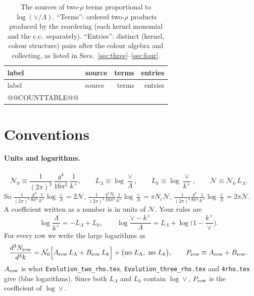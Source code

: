 \documentclass[10pt]{article}
\numberwithin{equation}{section}
\newcommand{\NN}{\mathcal N}
\newcommand{\NO}{\mathcal N_0}
\newcommand{\LL}{L_\Lambda}
\newcommand{\Lk}{L_k}
\begin{document}
\begin{longtable}{@{}l >{\raggedright\arraybackslash}p{} r r@{}}
\caption{The sources of two-$\rho$ terms proportional to $\log(\vee/\Lambda)$. ``Terms'': ordered two-$\rho$ products produced by the reordering (each kernel monomial and the c.c.\ separately). ``Entries'': distinct (kernel, colour structure) pairs after the colour algebra and collecting, as listed in Secs.~\ref{sec:three}--\ref{sec:four}.}\label{tab:count}\\
label & source & terms & entries\\ \hline\endfirsthead
label & source & terms & entries\\ \hline\endhead
@@COUNTTABLE@@
\end{longtable}

\section{Conventions}\label{sec:conv}
\paragraph{Units and logarithms.}
\begin{equation}
\NO\equiv\frac{1}{(2\pi)^3}\,\frac{g^4}{16\pi^5}\,\frac{1}{k^+},\qquad \LL\equiv\log\frac{\vee}{\Lambda},\qquad\Lk\equiv\log\frac{\vee}{k^+},\qquad \NN\equiv\NO\,\LL .
\end{equation}
So $\frac{1}{(2\pi)^3}\frac{g^4}{8\pi^5}\frac1{k^+}\log\frac\vee\Lambda=2\NN$, $\frac{1}{(2\pi)^3}\frac{g^4N_c}{16\pi^4}\frac1{k^+}\log\frac\vee\Lambda=\pi N_c\NN$, $\frac{1}{(2\pi)^3}\frac{g^4}{8\pi^4}\frac1{k^+}\log\frac\vee\Lambda=2\pi\NN$. A coefficient written as a number is in units of $\NN$. Your rules are
\begin{equation}
\log\frac{\Lambda}{k^+}=-\LL+\Lk,\qquad \log\frac{\vee-k^+}{\Lambda}=\LL+\log\Big(1-\frac{k^+}{\vee}\Big).
\end{equation}
For every row we write the large logarithms as
\begin{equation}
\frac{d^3N_{\rm row}}{d^3k}=\NO\Big[A_{\rm row}\,\LL+B_{\rm row}\,\Lk\Big]+\big(\text{no }\LL,\ \text{no }\Lk\big),\qquad P_{\rm row}\equiv A_{\rm row}+B_{\rm row}.
\label{eq:ABP}
\end{equation}
$A_{\rm row}$ is what \texttt{Evolution\_two\_rho.tex}, \texttt{Evolution\_three\_rho.tex} and \texttt{4rho.tex} give (blue logarithms). Since both $\LL$ and $\Lk$ contain $\log\vee$, $P_{\rm row}$ is the coefficient of $\log\vee$.
\end{document}
